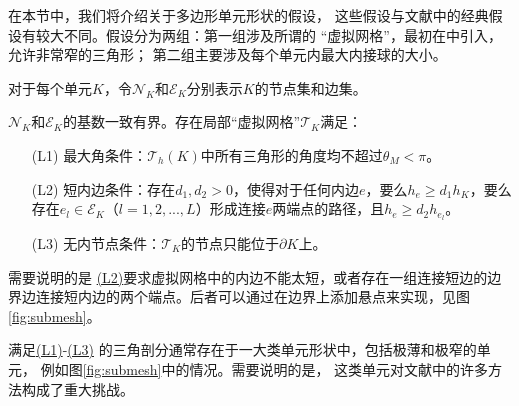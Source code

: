 在本节中，我们将介绍关于多边形单元形状的假设，
这些假设与文献中的经典假设有较大不同。假设分为两组：第一组涉及所谓的
“虚拟网格”，最初在\cite{2021CaoChenGuo}中引入，允许非常窄的三角形；
第二组主要涉及每个单元内最大内接球的大小。

对于每个单元$K$，令$\mathcal{N}_K$和$\mathcal{E}_K$分别表示$K$的节点集和边集。
\begin{assumption}
\label{assump_vmesh}
$\mathcal{N}_K$和$\mathcal{E}_K$的基数一致有界。存在局部“虚拟网格”$\mathcal{T}_K$满足：
\begin{itemize}
\item[(L1)] \label{asp:polygonL1} 最大角条件：$\mathcal T_h(K)$中所有三角形的角度均不超过$\theta_M< \pi$。
\item[(L2)] \label{asp:polygonL2} 短内边条件：存在$d_1, d_2 > 0$，使得对于任何内边$e$，要么$h_e \ge d_1 h_K$，要么存在$e_l\in\mathcal{E}_K$（$l=1,2,...,L$）形成连接$e$两端点的路径，且$h_e\ge d_2 h_{e_l}$。
\item[(L3)] \label{asp:polygonL3} 无内节点条件：$\mathcal{T}_K$的节点只能位于$\partial K$上。
\end{itemize}
\end{assumption}
\label{rem_auxiliary_space}
需要说明的是
\hyperref[asp:polygonL2]{(L2)}要求虚拟网格中的内边不能太短，或者存在一组连接短边的边界边连接短内边的两个端点。后者可以通过在边界上添加悬点来实现，见图\ref{fig:submesh}。

满足\hyperref[asp:polygonL1]{(L1)}-\hyperref[asp:polygonL3]{(L3)}
的三角剖分通常存在于一大类单元形状中，包括极薄和极窄的单元，
例如图\ref{fig:submesh}中的情况。需要说明的是，
这类单元对文献中的许多方法构成了重大挑战。

